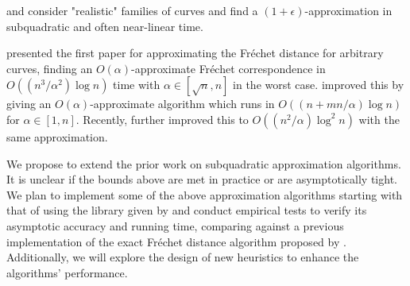 \documentclass{article}
\begin{document}
\citet{approximatingforrealisticcurvesDriemel} and \citet{frechetDistanceOnCPickedCurves} consider "realistic" families of curves and find a $(1 + \epsilon)$-approximation in subquadratic and often near-linear time.

\citet{approximatingFrechetDistance} presented the first paper for approximating the Fr{\'e}chet distance for arbitrary curves, finding an $O(\alpha)$-approximate Fr{\'e}chet correspondence in $O((n^3/\alpha^2)\log n)$ time with $\alpha \in \left[\sqrt{n}, n\right]$ in the worst case. \citet{neApproximation} improved this by giving an $O(\alpha)$-approximate algorithm which runs in $O((n + mn/\alpha) \log n)$ for $\alpha \in \left[1, n\right]$.
Recently, \citet{truncatedSmoothing} further improved this to $O((n^2/\alpha) \log ^2 n)$ with the same approximation.

We propose to extend the prior work on subquadratic approximation algorithms. It is unclear if the bounds above are met in practice or are asymptotically tight. We plan to implement some of the above approximation algorithms starting with that of \citet{approximatingFrechetDistance} using the library given by \citet{priorImplementation} and conduct empirical tests to verify its asymptotic accuracy and running time, comparing against a previous implementation \cite{priorImplementation} of the exact Fr{\'e}chet distance algorithm proposed by \citet{computingFrechetBetweenPolygonalCurves}. Additionally, we will explore the design of new heuristics to enhance the algorithms' performance.



\printbibliography
\end{document}
